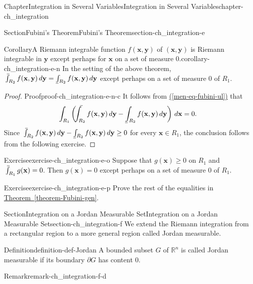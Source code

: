 \documentclass[oneside,10pt,]{book}
\makeatletter
\newcommand{\xreffont}{\relax}
\numberwithin{equation}{section}
\newcommand{\bx}{\mathbf{x}}
\newcommand{\by}{\mathbf{y}}
\newcommand{\bbR}{\mathbb{R}}
\def\upint{\mathchoice
    {\mkern10mu\overline{\vphantom{\intop}\mkern7mu}\mkern-24mu}
    {\mkern7mu\overline{\vphantom{\intop}\mkern7mu}\mkern-14mu}
    {\mkern7mu\overline{\vphantom{\intop}\mkern7mu}\mkern-14mu}
    {\mkern7mu\overline{\vphantom{\intop}\mkern7mu}\mkern-14mu}
  \int}
\def\lowint{\relax\if@display
 \mkern3mu\underline{\vphantom{\intop}\mkern7mu}\mkern-10mu\int
\else 
\underline{\vphantom{\int}\mkern7mu}\mkern-10mu\int
\fi}
\makeatother
\begin{document}
\begin{chapterptx}{Chapter}{Integration in Several Variables}{}{Integration in Several Variables}{}{}{chapter-ch_integration}
\begin{sectionptx}{Section}{Fubini's Theorem}{}{Fubini's Theorem}{}{}{section-ch_integration-e}
\begin{corollary}{Corollary}{A Riemann integrable function \(f(\bx, \by)\) of \((\bx, \by)\) is Riemann integrable in \(\by\) except  perhaps for \(\bx\) on a set of measure \(0\).}{}{corollary-ch_integration-e-n}%
In the setting of the above theorem, \(\upint_{R_{2}} f(\bx, \by)\, d\by= \lowint_{R_{2}} f(\bx, \by)\, d\by\) except perhaps on a set of measure \(0\) of \(R_{1}\).%
\end{corollary}
\begin{proof}{Proof}{}{proof-ch_integration-e-n-c}
It follows from \hyperref[men-eq-fubini-ul]{({\xreffont\ref{men-eq-fubini-ul}})} that%
\begin{equation*}
\int_{R_{1}} \left( \upint_{R_{2}} f(\bx, \by)\, d\by - \lowint_{R_{2}} f(\bx, \by)\, d\by\right)\, d\bx
=0.
\end{equation*}
Since \(\upint_{R_{2}} f(\bx, \by)\, d\by - \lowint_{R_{2}} f(\bx, \by)\, d\by\ge 0\) for every \(\bx\in R_{1}\), the conclusion follows from the following exercise.\end{proof}
\begin{inlineexercise}{Exercise}{}{exercise-ch_integration-e-o}%
Suppose that \(g(\bx)\ge 0\) on \(R_{1}\) and \(\upint_{R_{1}} g(\bx )=0\). Then \(g(\bx)=0\) except perhaps on a set of measure \(0\) of \(R_{1}\).%
\end{inlineexercise}%
\begin{inlineexercise}{Exercise}{}{exercise-ch_integration-e-p}%
Prove the rest of the equalities in \hyperref[theorem-Fubini-gen]{Theorem~{\xreffont\ref{theorem-Fubini-gen}}}.%
\end{inlineexercise}%
\end{sectionptx}
%
%
\typeout{************************************************}
\typeout{************************************************}
%
\begin{sectionptx}{Section}{Integration on a Jordan Measurable Set}{}{Integration on a Jordan Measurable Set}{}{}{section-ch_integration-f}
We extend the Riemann integration from a rectangular region to a more general region called Jordan measurable.\begin{definition}{Definition}{}{definition-def-Jordan}%
%
A bounded subset \(G\) of \(\bbR^{n}\) is called Jordan measurable if its boundary \(\partial G\) has content \(0\).\end{definition}
\begin{remark}{Remark}{}{remark-ch_integration-f-d}%

\end{remark}
\end{sectionptx}
\end{chapterptx}
\end{document}
